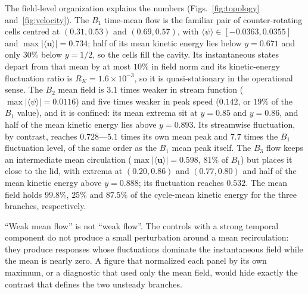 \documentclass[11pt,a4paper]{article}
\newenvironment{chgadd}{\par\color{blue}}{\par\color{black}}
\begin{document}
\begin{chgadd}
The field-level organization explains the numbers (Figs.~\ref{fig:topology}
and~\ref{fig:velocity}). The $B_1$ time-mean flow is the familiar pair of
counter-rotating cells centred at $(0.31,0.53)$ and $(0.69,0.57)$, with
$\langle\psi\rangle\in[-0.0363,0.0355]$ and $\max|\langle\mathbf{u}\rangle|=0.734$;
half of its mean kinetic energy lies below $y=0.671$ and only $30\%$ below
$y=1/2$, so the cells fill the cavity. Its instantaneous states depart from that
mean by at most $10\%$ in field norm and its kinetic-energy fluctuation ratio is
$R_K=1.6\times10^{-3}$, so it is quasi-stationary in the operational sense. The
$B_2$ mean field is $3.1$ times weaker in stream function
($\max|\langle\psi\rangle|=0.0116$) and five times weaker in peak speed ($0.142$,
or $19\%$ of the $B_1$ value), and it is confined: its mean extrema sit at
$y=0.85$ and $y=0.86$, and half of the mean kinetic energy lies above $y=0.893$.
Its streamwise fluctuation, by contrast, reaches $0.728$---$5.1$ times its own mean
peak and $7.7$ times the $B_1$ fluctuation level, of the same order as the
$B_1$ mean peak itself. The $B_3$ flow keeps an intermediate mean circulation
($\max|\langle\mathbf{u}\rangle|=0.598$, $81\%$ of $B_1$) but places it close to
the lid, with extrema at $(0.20,0.86)$ and $(0.77,0.80)$ and half of the mean
kinetic energy above $y=0.888$; its fluctuation reaches $0.532$. The mean field
holds $99.8\%$, $25\%$ and $87.5\%$ of the cycle-mean kinetic energy for the three
branches, respectively.

``Weak mean flow'' is not ``weak flow''. The controls with a strong
temporal component do not produce a small perturbation around a mean
recirculation: they produce responses whose fluctuations dominate the
instantaneous field while the mean is nearly zero. A figure that normalized each
panel by its own maximum, or a diagnostic that used only the mean field, would
hide exactly the contrast that defines the two unsteady branches.


\end{chgadd}
\end{document}

